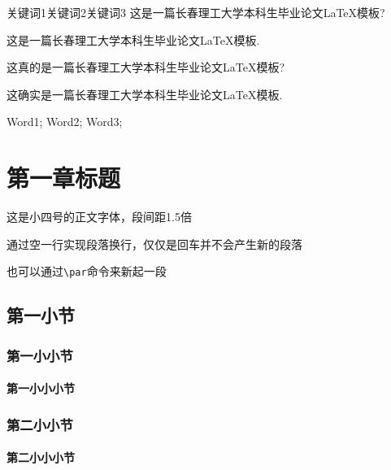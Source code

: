 \documentclass{CustGraduPaper}
\begin{document}
\author{姓名}
\makecover
\makestatement

\begin{cnabstract}{关键词1\quad 关键词2\quad 关键词3}%
	这是一篇长春理工大学本科生毕业论文\LaTeX 模板?

	这是一篇长春理工大学本科生毕业论文\LaTeX 模板.

	这真的是一篇长春理工大学本科生毕业论文\LaTeX 模板?

	这确实是一篇长春理工大学本科生毕业论文\LaTeX 模板.
\end{cnabstract}
\begin{enabstract}{Word1; Word2; Word3;}%
	\lipsum[1]

	\lipsum[2]

	\lipsum[3]
\end{enabstract}


\makecontents %
\chapter{第一章标题}
这是小四号的正文字体，段间距1.5倍

通过空一行实现段落换行，仅仅是回车并不会产生新的段落
\par 也可以通过\verb|\par|命令来新起一段
\section{第一小节}
\subsection{第一小小节}
\subsubsection{第一小小小节}
\subsection{第二小小节}
\subsubsection{第二小小小节}\label{subsubsubsec:subsubsubsec}
\end{document}
